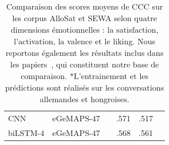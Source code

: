 \begin{table}[ht!]
\begin{tabular}{| l| l |l |c | c | c |}
           \hline
           \rowcolor{Red}
           CNN      &eGeMAPS-47   & &.571  &.517 & \\
           \rowcolor{Red}
           biLSTM-4 &eGeMAPS-47   & &.568  &.561 & \\
           \hline
      \end{tabular}
      \caption{Comparaison des scores moyens de CCC sur les corpus AlloSat et SEWA selon quatre dimensions émotionnelles : la satisfaction, l'activation, la valence et le liking. Nous reportons également les résultats inclus dans les papiers~\cite{AVEC2018,AVEC2019,Schmitt2019}, qui constituent notre base de comparaison.
      *L'entrainement et les prédictions sont réalisés sur les conversations allemandes et hongroises.}
      \label{tab:allosatVSsewa}
  \end{table}
